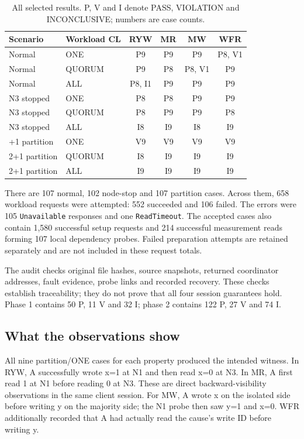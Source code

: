 \documentclass[lang=en,11pt,a4paper,bibend=bibtex]{elegantpaper}
\begin{document}
\begin{table}[H]
\centering\small
\caption{All selected results. P, V and I denote PASS, VIOLATION and INCONCLUSIVE; numbers are case counts.}
\renewcommand{\arraystretch}{1.2}
\begin{tabular*}{\linewidth}{@{\extracolsep{\fill}}llcccc@{}}
\toprule
\textbf{Scenario} & \textbf{Workload CL} & \textbf{RYW} & \textbf{MR} & \textbf{MW} & \textbf{WFR} \\
\midrule
Normal & ONE & P9 & P9 & P9 & P8, V1 \\
Normal & QUORUM & P9 & P8 & P8, V1 & P9 \\
Normal & ALL & P8, I1 & P9 & P9 & P9 \\
\addlinespace[4pt]
N3 stopped & ONE & P8 & P8 & P9 & P9 \\
N3 stopped & QUORUM & P8 & P9 & P9 & P8 \\
N3 stopped & ALL & I8 & I9 & I8 & I9 \\
\addlinespace[4pt]
2+1 partition & ONE & V9 & V9 & V9 & V9 \\
2+1 partition & QUORUM & I8 & I9 & I9 & I9 \\
2+1 partition & ALL & I9 & I9 & I9 & I9 \\
\bottomrule
\end{tabular*}
\end{table}
There are 107 normal, 102 node-stop and 107 partition cases. Across them, 658 workload requests were attempted: 552 succeeded and 106 failed. The errors were 105 \texttt{Unavailable} responses and one \texttt{ReadTimeout}. The accepted cases also contain 1,580 successful setup requests and 214 successful measurement reads forming 107 local dependency probes. Failed preparation attempts are retained separately and are not included in these request totals.

The audit checks original file hashes, source snapshots, returned coordinator addresses, fault evidence, probe links and recorded recovery. These checks establish traceability; they do not prove that all four session guarantees hold. Phase 1 contains 50 P, 11 V and 32 I; phase 2 contains 122 P, 27 V and 74 I.

\subsection{What the observations show}
All nine partition/ONE cases for each property produced the intended witness. In RYW, A successfully wrote x=1 at N1 and then read x=0 at N3. In MR, A first read 1 at N1 before reading 0 at N3. These are direct backward-visibility observations in the same client session. For MW, A wrote x on the isolated side before writing y on the majority side; the N1 probe then saw y=1 and x=0. WFR additionally recorded that A had actually read the cause's write ID before writing y.
\end{document}
